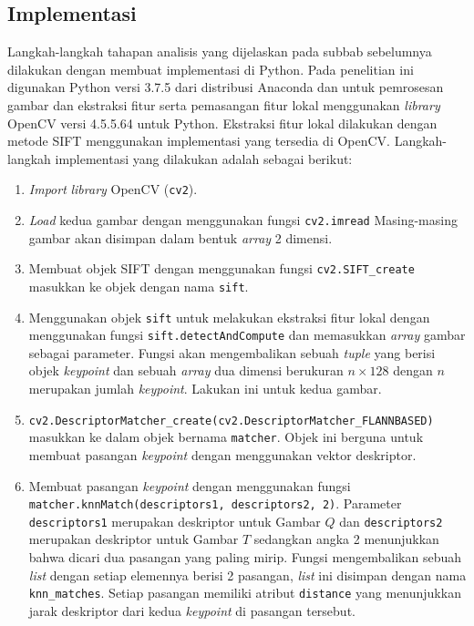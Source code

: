 \subsection{Implementasi}
\label{subsec:tahapan_implementasi_analisis_poi}
Langkah-langkah tahapan analisis yang dijelaskan pada subbab sebelumnya dilakukan dengan membuat implementasi di Python. Pada penelitian ini digunakan Python versi 3.7.5 dari distribusi Anaconda dan untuk pemrosesan gambar dan ekstraksi fitur serta pemasangan fitur lokal menggunakan \textit{library} OpenCV versi 4.5.5.64 untuk Python. Ekstraksi fitur lokal dilakukan dengan metode SIFT menggunakan implementasi yang tersedia di OpenCV. Langkah-langkah implementasi yang dilakukan adalah sebagai berikut:
\begin{enumerate}
	\item \textit{Import} \textit{library} OpenCV (\texttt{cv2}). 
	\item \textit{Load} kedua gambar dengan menggunakan fungsi \texttt{cv2.imread} Masing-masing gambar akan disimpan dalam bentuk \textit{array} 2 dimensi.
	\item Membuat objek SIFT dengan menggunakan fungsi \texttt{cv2.SIFT\_create} masukkan ke objek dengan nama \texttt{sift}. 
	\item Menggunakan objek \texttt{sift} untuk melakukan ekstraksi fitur lokal dengan menggunakan fungsi \texttt{sift.detectAndCompute} dan memasukkan \textit{array} gambar sebagai parameter. Fungsi akan mengembalikan sebuah \textit{tuple} yang berisi objek \textit{keypoint} dan sebuah \textit{array} dua dimensi berukuran $n \times 128$ dengan $n$ merupakan jumlah \textit{keypoint}. Lakukan ini untuk kedua gambar.
	\item {} \texttt{cv2.DescriptorMatcher\_create(cv2.DescriptorMatcher\_FLANNBASED)} masukkan ke dalam objek bernama \texttt{matcher}. Objek ini berguna untuk membuat pasangan \textit{keypoint} dengan menggunakan vektor deskriptor.
	\item Membuat pasangan \textit{keypoint} dengan menggunakan fungsi \texttt{matcher.knnMatch(descriptors1, descriptors2, 2)}. Parameter \texttt{descriptors1} merupakan deskriptor untuk Gambar $Q$ dan \texttt{descriptors2} merupakan deskriptor untuk Gambar $T$ sedangkan angka 2 menunjukkan bahwa dicari dua pasangan yang paling mirip. Fungsi mengembalikan sebuah \textit{list} dengan setiap elemennya berisi 2 pasangan, \textit{list} ini disimpan dengan nama \texttt{knn\_matches}. Setiap pasangan memiliki atribut \texttt{distance} yang menunjukkan jarak deskriptor dari kedua \textit{keypoint} di pasangan tersebut. 

\end{enumerate}
